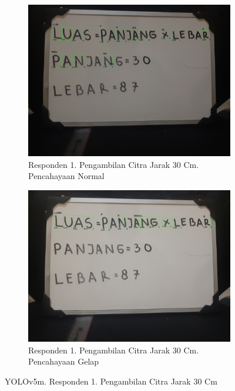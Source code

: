 \begin{figure}[H]
  \begin{subfigure}{.5\textwidth}
    \centering
    \captionsetup{width=.8\linewidth}
    \includegraphics[width=.8\linewidth]{gambar/yolov5m/responden1/dinda30cm00-result.jpg}
    \caption{Responden 1. Pengambilan Citra Jarak 30 Cm. Pencahayaan Normal}
    \label{fig:mr1tcitra30cm}
  \end{subfigure}%
  \begin{subfigure}{.5\textwidth}
    \centering
    \captionsetup{width=.8\linewidth}
    \includegraphics[width=.8\linewidth]{gambar/yolov5m/responden1/dinda30cm10-result.jpg}
    \caption{Responden 1. Pengambilan Citra Jarak 30 Cm. Pencahayaan Gelap}
    \label{fig:mr1gcitra30cm}
  \end{subfigure}
  \caption{YOLOv5m. Responden 1. Pengambilan Citra Jarak 30 Cm}
  \label{fig:mr1citra30cm}
\end{figure}

